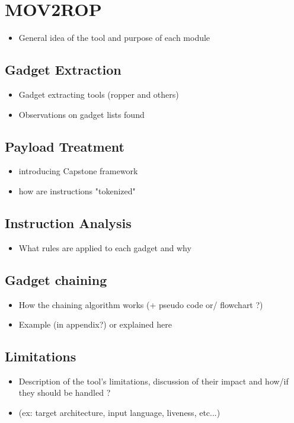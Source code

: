 \documentclass[10pt,twocolumn]{article}
\begin{document}
\section{MOV2ROP}
\begin{itemize}
    \item General idea of the tool and purpose of each module
\end{itemize}

\subsection{Gadget Extraction}
\begin{itemize}
    \item Gadget extracting tools (ropper and others)
    \item Observations on gadget lists found
\end{itemize}

\subsection{Payload Treatment}
\begin{itemize}
    \item introducing Capstone framework
    \item how are instructions "tokenized"
\end{itemize}
\subsection{Instruction Analysis}
\begin{itemize}
    \item What rules are applied to each gadget and why
\end{itemize}
\subsection{Gadget chaining}
\begin{itemize}
    \item How the chaining algorithm works (+ pseudo code or/ flowchart ?)
    \item Example (in appendix?) or explained here
\end{itemize}
\subsection{Limitations}
\begin{itemize}
    \item Description of the tool's limitations, discussion of their impact and
        how/if they should be handled ?
    \item (ex: target architecture, input language, liveness, etc...)
\end{itemize}
\end{document}
